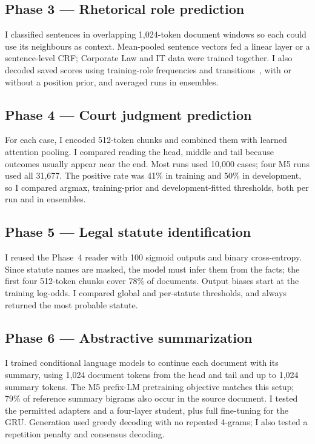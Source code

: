 \documentclass[11pt, oneside]{article}
\begin{document}
\subsection{Phase 3 --- Rhetorical role prediction}\label{sec:p3}
I classified sentences in overlapping 1{,}024-token document windows so each could use its neighbours as context.
Mean-pooled sentence vectors fed a linear layer or a sentence-level CRF; Corporate Law and IT data were trained
together. I also decoded saved scores using training-role frequencies and transitions~\cite{menon,hybrid}, with
or without a position prior, and averaged runs in ensembles.

\subsection{Phase 4 --- Court judgment prediction}\label{sec:p4}
For each case, I encoded 512-token chunks and combined them with learned attention pooling. I compared reading
the head, middle and tail because outcomes usually appear near the end. Most runs used 10{,}000 cases; four M5
runs used all 31{,}677. The positive rate was 41\% in training and 50\% in development, so I compared argmax,
training-prior and development-fitted thresholds, both per run and in ensembles.

\subsection{Phase 5 --- Legal statute identification}\label{sec:p5}
I reused the Phase~4 reader with 100 sigmoid outputs and binary cross-entropy. Since statute names are masked,
the model must infer them from the facts; the first four 512-token chunks cover 78\% of documents. Output biases
start at the training log-odds. I compared global and per-statute thresholds, and always returned the most probable
statute.

\subsection{Phase 6 --- Abstractive summarization}\label{sec:p6}
I trained conditional language models to continue each document with its summary, using 1{,}024 document tokens
from the head and tail and up to 1{,}024 summary tokens. The M5 prefix-LM pretraining objective matches this setup;
79\% of reference summary bigrams also occur in the source document. I tested the permitted adapters and a
four-layer student, plus full fine-tuning for the GRU. Generation used greedy decoding with no repeated 4-grams;
I also tested a repetition penalty and consensus decoding.
\end{document}
